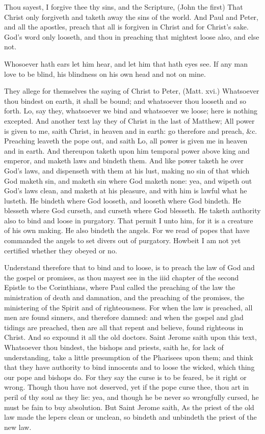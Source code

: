 Thou sayest, I forgive thee thy sins, and the Scripture, 
(John the first) That Christ only forgiveth and taketh away 
the sins of the world. And Paul and Peter, and all the 
apostles, preach that all is forgiven in Christ and for Christ's 
sake. God's word only looseth, and thou in preaching 
that mightest loose also, and else not. 

Whosoever hath ears let him hear, and let him that hath 
eyes see. If any man love to be blind, his blindness on 
his own head and not on mine. 


They allege for themselves the saying of Christ to 
Peter, (Matt. xvi.) Whatsoever thou bindest on earth, it 
shall be bound; and whatsoever thou looseth and so forth. 
Lo, say they, whatsoever we bind and whatsoever we loose; 
here is nothing excepted. And another text lay they of 
Christ in the last of Matthew; All power is given to me, 
saith Christ, in heaven and in earth: go therefore and 
preach, \&c. Preaching leaveth the pope out, and saith 
Lo, all power is given me in heaven and in earth. And 
thereupon taketh upon him temporal power above king and 
emperor, and maketh laws and bindeth them. And like 
power taketh he over God's laws, and dispenseth with them 
at his lust, making no sin of that which God maketh sin, 
and maketh sin where God maketh none: yea, and wipeth 
out God's laws clean, and maketh at his pleasure, and 
with him is lawful what he lusteth. He bindeth where 
God looseth, and looseth where God bindeth. He blesseth
where God curseth, and curseth where God blesseth. 
He taketh authority also to bind and loose in purgatory.
That permit I unto him, for it is a creature of his 
own making. He also bindeth the angels. For we read 
of popes that have commanded the angels to set divers 
out of purgatory. Howbeit I am not yet certified whether 
they obeyed or no. 

Understand therefore that to bind and to loose, is to 
preach the law of God and the gospel or promises, as thou 
mayest see in the iiid chapter of the second Epistle to tbe 
Corinthians, where Paul called the preaching of the law the 
ministration of death and damnation, and the preaching 
of the promises, the ministering of the Spirit and of 
righteousness. For when the law is preached, all men are 
found sinners, and therefore damned: and when the gospel
and glad tidings are preached, then are all that repent 
and believe, found righteous in Christ. And so expound 
it all the old doctors. Saint Jerome saith upon this text, 
Whatsoever thou bindest, the bishops and priests, saith he, 
for lack of understanding, take a little presumption of the 
Pharisees upon them; and think that they have authority to 
bind innocents and to loose the wicked, which thing our 
pope and bishops do. For they say the curse is to be
feared, be it right or wrong. Though thou have not deserved,
yet if the pope curse thee, thou art in peril of thy 
soul as they lie: yea, and though he be never so wrongfully
cursed, he must be fain to buy absolution. But
Saint Jerome saith, As the priest of the old law made the
lepers clean or unclean, so bindeth and unbindeth the 
priest of the new law. 

